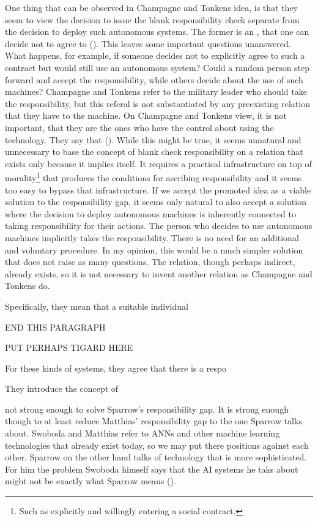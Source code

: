 \documentclass{article}
\newcounter{example}
\begin{document}
One thing that can be observed in Champagne and Tonkens idea, is that they seem
to view the decision to issue the blank responsibility check separate from
the decision to deploy such autonomous systems. The former is an , that one can decide not to agree to (\cite[p. 132-133,134]{champagne2015bridging}).
This leaves some important questions unanswered. What happens, for example, if
someone decides not to explicitly agree to such a contract but would still use
an autonomous system? Could a random person step forward and accept the
responsibility, while others decide about the use of such machines? Champagne
and Tonkens refer to the military leader who should take the responsibility, but
this referal is not substantiated by any preexisting relation that they have to
the machine. On Champagne and Tonkens view, it is not important, that they are
the ones who have the control about using the technology. They say that  (\cite[p.
127]{champagne2015bridging}). While this might be true, it seems unnatural and
unnecessary to base the concept of blank check responsibility on a relation that
exists only because it implies itself. It requires a practical infrastructure on top of
morality\footnote{Such as explicitly and willingly entering a social contract.}
that produces the conditions for ascribing responsibility and it seems too easy
to bypass that infrastructure. If we accept the promoted idea as a viable
solution to the responsibility gap, it seems only natural to also accept a
solution where the decision to deploy autonomous machines is inherently
connected to taking responsibility for their actions. The person who
decides to use autonomous machines implicitly takes the responsibility. There is
no need for an additional and voluntary procedure. In my opinion, this would be
a much simpler solution that does not raise as many questions. The relation,
though perhaps indirect, already exists, so it is not necessary to invent
another relation as Champagne and Tonkens do.

Specifically, they mean that a suitable individual 


END THIS PARAGRAPH

PUT PERHAPS TIGARD HERE


\newpage
For these kinds of systems, they agree that there
is a respo

They introduce the concept of 

not strong enough to
solve Sparrow's responsibility gap. It is strong enough though to at least
reduce Matthias' responsibility gap to the one Sparrow talks about. Swoboda and
Matthias refer to ANNs and other machine learning technologies that already
exist today, so we may put there positions against each other. Sparrow on the
other hand talks of technology that is more sophisticated. For him the problem 
Swoboda himself says that the AI systems he taks about might not be exactly what
Sparrow means (\cite[p. 309]{swoboda2017autonomous}).
\end{document}
